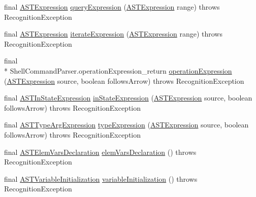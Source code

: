 \begin{DoxyCompactItemize}
\item 
final \hyperlink{classorg_1_1tzi_1_1use_1_1parser_1_1ocl_1_1_a_s_t_expression}{A\-S\-T\-Expression} \hyperlink{classorg_1_1tzi_1_1use_1_1parser_1_1shell_1_1_shell_command_parser_a46d47a7afaf6a31c09893cf263d549cc}{query\-Expression} (\hyperlink{classorg_1_1tzi_1_1use_1_1parser_1_1ocl_1_1_a_s_t_expression}{A\-S\-T\-Expression} range)  throws Recognition\-Exception 
\item 
final \hyperlink{classorg_1_1tzi_1_1use_1_1parser_1_1ocl_1_1_a_s_t_expression}{A\-S\-T\-Expression} \hyperlink{classorg_1_1tzi_1_1use_1_1parser_1_1shell_1_1_shell_command_parser_a697de972217ac97cfb830e57ed4dda2d}{iterate\-Expression} (\hyperlink{classorg_1_1tzi_1_1use_1_1parser_1_1ocl_1_1_a_s_t_expression}{A\-S\-T\-Expression} range)  throws Recognition\-Exception 
\item 
final \\*
Shell\-Command\-Parser.\-operation\-Expression\-\_\-return \hyperlink{classorg_1_1tzi_1_1use_1_1parser_1_1shell_1_1_shell_command_parser_a767295a5df98694a28e224719e93d2a0}{operation\-Expression} (\hyperlink{classorg_1_1tzi_1_1use_1_1parser_1_1ocl_1_1_a_s_t_expression}{A\-S\-T\-Expression} source, boolean follows\-Arrow)  throws Recognition\-Exception 
\item 
final \hyperlink{classorg_1_1tzi_1_1use_1_1parser_1_1ocl_1_1_a_s_t_in_state_expression}{A\-S\-T\-In\-State\-Expression} \hyperlink{classorg_1_1tzi_1_1use_1_1parser_1_1shell_1_1_shell_command_parser_a147e63b1dde5057653ab6985dc7d3d31}{in\-State\-Expression} (\hyperlink{classorg_1_1tzi_1_1use_1_1parser_1_1ocl_1_1_a_s_t_expression}{A\-S\-T\-Expression} source, boolean follows\-Arrow)  throws Recognition\-Exception 
\item 
final \hyperlink{classorg_1_1tzi_1_1use_1_1parser_1_1ocl_1_1_a_s_t_type_arg_expression}{A\-S\-T\-Type\-Arg\-Expression} \hyperlink{classorg_1_1tzi_1_1use_1_1parser_1_1shell_1_1_shell_command_parser_a696203434b49135caf3fffbc3d22a974}{type\-Expression} (\hyperlink{classorg_1_1tzi_1_1use_1_1parser_1_1ocl_1_1_a_s_t_expression}{A\-S\-T\-Expression} source, boolean follows\-Arrow)  throws Recognition\-Exception 
\item 
final \hyperlink{classorg_1_1tzi_1_1use_1_1parser_1_1ocl_1_1_a_s_t_elem_vars_declaration}{A\-S\-T\-Elem\-Vars\-Declaration} \hyperlink{classorg_1_1tzi_1_1use_1_1parser_1_1shell_1_1_shell_command_parser_a55d080d961772461d4e6225271c9da55}{elem\-Vars\-Declaration} ()  throws Recognition\-Exception 
\item 
final \hyperlink{classorg_1_1tzi_1_1use_1_1parser_1_1ocl_1_1_a_s_t_variable_initialization}{A\-S\-T\-Variable\-Initialization} \hyperlink{classorg_1_1tzi_1_1use_1_1parser_1_1shell_1_1_shell_command_parser_a4706834076a80bc3798486d05eda44f2}{variable\-Initialization} ()  throws Recognition\-Exception 

\end{DoxyCompactItemize}
